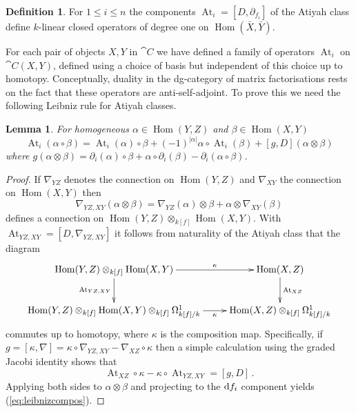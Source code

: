 \documentclass{compositio}
\newtheorem{lemma}[theorem]{Lemma}
\theoremstyle{definition}
\newtheorem{definition}[theorem]{Definition}
\numberwithin{equation}{section}
\def\Hom{\operatorname{Hom}}
\DeclareMathOperator{\At}{At}
\begin{document}
\begin{definition} For $1 \le i \le n$ the components $\At_i = [D, \partial_{f_i}]$ of the Atiyah class define $k$-linear closed operators of degree one on $\Hom(\bar{X}, \bar{Y})$.
\end{definition}

For each pair of objects $X,Y$ in $\cat{C}$ we have defined a family of operators $\At_i$ on $\cat{C}(X,Y)$, defined using a choice of basis but independent of this choice up to homotopy. Conceptually, duality in the dg-category of matrix factorisations rests on the fact that these operators are anti-self-adjoint. To prove this we need the following Leibniz rule for Atiyah classes.

\begin{lemma}\label{lemma:leibnizatiyah} For homogeneous $\alpha \in \Hom(Y,Z)$ and $\beta \in \Hom(X,Y)$
\begin{equation}\label{eq:leibnizcompos}
\At_i( \alpha \circ \beta ) = \At_i(\alpha) \circ \beta + (-1)^{|\alpha|} \alpha \circ \At_i(\beta) + [g,D]( \alpha \otimes \beta)
\end{equation}
where $g( \alpha \otimes \beta ) = \partial_i(\alpha) \circ \beta + \alpha \circ \partial_i(\beta) - \partial_i( \alpha \circ \beta )$.
\end{lemma}
\begin{proof}
If $\nabla_{YZ}$ denotes the connection on $\Hom(Y,Z)$ and $\nabla_{XY}$ the connection on $\Hom(X,Y)$ then
\[
\nabla_{YZ,XY}(\alpha \otimes \beta) = \nabla_{YZ}(\alpha) \otimes \beta + \alpha \otimes \nabla_{XY}(\beta)
\]
defines a connection on $\Hom(Y,Z) \otimes_{k[f]} \Hom(X,Y)$. With $\At_{YZ,XY} = [D, \nabla_{YZ,XY}]$ it follows from naturality of the Atiyah class \cite{??} that the diagram
\[
\xymatrix{
\Hom(Y,Z) \otimes_{k[f]} \Hom(X,Y) \ar[d]_{\At_{YZ,XY}}\ar[r]^-{\kappa} & \Hom(X,Z) \ar[d]^{\At_{XZ}}\\
\Hom(Y,Z) \otimes_{k[f]} \Hom(X,Y) \otimes_{k[f]} \Omega^1_{k[f]/k} \ar[r]_-{\kappa} & \Hom(X,Z) \otimes_{k[f]} \Omega^1_{k[f]/k}
}
\]
commutes up to homotopy, where $\kappa$ is the composition map. Specifically, if $g = [\kappa, \nabla] = \kappa \circ \nabla_{YZ,XY} - \nabla_{XZ} \circ \kappa$ then a simple calculation using the graded Jacobi identity shows that
\[
\At_{XZ} \circ \kappa - \kappa \circ \At_{YZ,XY} = [g,D]\,.
\]
Applying both sides to $\alpha \otimes \beta$ and projecting to the $\mathrm{d} f_i$ component yields (\ref{eq:leibnizcompos}).
\end{proof}
\end{document}
